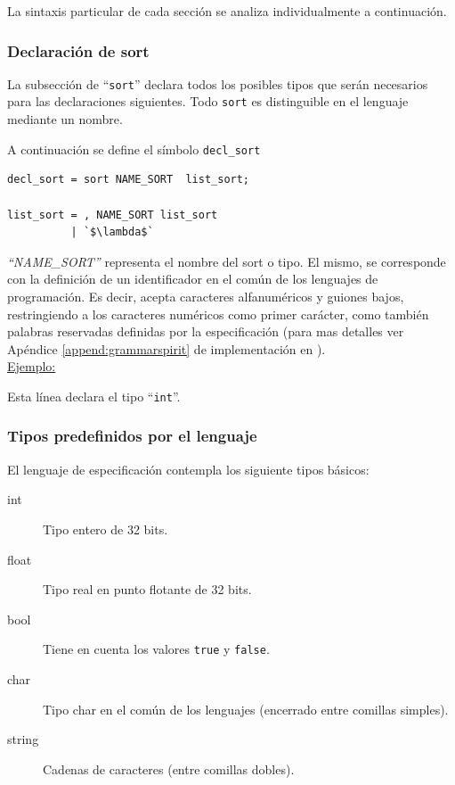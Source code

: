La sintaxis particular de cada sección se analiza individualmente a continuación.

\subsubsection{Declaración de sort}
La subsección de ``\texttt{sort}'' declara todos los posibles tipos que serán necesarios para las declaraciones siguientes. Todo \texttt{sort} es distinguible en el lenguaje mediante un nombre.

A continuación se define el símbolo \texttt{decl\_sort}

\vspace{0.3cm}
\begin{lstlisting}[frame=shadowbox, rulesepcolor=\color{azul}, language=specmag, linewidth=10cm]
decl_sort = sort NAME_SORT  list_sort;

list_sort = , NAME_SORT list_sort
          | `$\lambda$`
\end{lstlisting}
\vspace{0.3cm}

\textit{``NAME\_SORT''} representa el nombre del sort o tipo. El mismo, se corresponde con la definición de un identificador en el común de los lenguajes de programación. Es decir, acepta caracteres alfanuméricos y guiones bajos, restringiendo a los caracteres numéricos como primer carácter, como también palabras reservadas definidas por la especificación (para mas detalles ver Apéndice \ref{append:grammarspirit} de implementación en \spirit).\\

\underline{Ejemplo:} \begin{center}  \end{center}
\vspace{0.2cm}
Esta línea declara el tipo ``\texttt{int}''.

\subsubsection*{Tipos predefinidos por el lenguaje}
\label{sec:typepredefined}

El lenguaje de especificación contempla los siguiente tipos básicos:

\begin{description}
\item [int] Tipo entero de 32 bits.

\item [float] Tipo real en punto flotante de 32 bits.

\item [bool] Tiene en cuenta los valores \texttt{true} y \texttt{false}.

\item [char] Tipo char en el común de los lenguajes (encerrado entre comillas simples).

\item [string] Cadenas de caracteres (entre comillas dobles).
\end{description}

